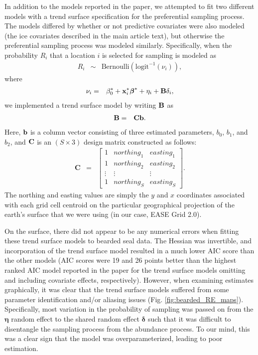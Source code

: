 \documentclass[times,mee,doublespace,]{besauth2}
\begin{document}
\begin{flushleft}

In addition to the models reported in the paper, we attempted to fit two different models with a trend surface specification for the preferential sampling process.  The models differed by whether or not predictive covariates were also modeled (the ice covariates described in the main article text), but otherwise the preferential sampling process was modeled similarly.  Specifically, when the probability $R_i$ that a location $i$ is selected for sampling is modeled as
\begin{eqnarray}
 \label{eq:R}
  R_i & \sim & \text{Bernoulli}(\textrm{logit}^{-1}(\nu_i)),
\end{eqnarray}
where
\begin{eqnarray}
  \label{eq:nu}
  \nu_i & = & \beta_0^* + {\bf x}_i^* \boldsymbol{\beta}^*+\eta_i+{\bf B} \delta_i,
\label{eq:nu}
\end{eqnarray}
we implemented a trend surface model by writing $\bf{B}$ as
\begin{eqnarray}
  \label{eq:B}
  \textbf{B} & = & {\bf C}{\bf b}.
\end{eqnarray}
Here, ${\bf b}$ is a column vector consisting of three estimated parameters, $b_0$, $b_1$, and $b_2$, and ${\bf C}$ is an $(S \times 3)$ design matrix constructed as follows:
\begin{eqnarray}
  \textbf{C} & = & \left[
    \begin{array}{ccc}
    1 & northing_1 & easting_1 \\
    1 & northing_2 & easting_2 \\
    \vdots & \vdots & \vdots \\
    1 & northing_S & easting_S
    \end{array}
  \right].
\end{eqnarray}
The northing and easting values are simply the $y$ and $x$ coordinates associated with each grid cell centroid on the particular geographical projection of the earth's surface that we were using (in our case, EASE Grid 2.0).

\hspace{0.5in} On the surface, there did not appear to be any numerical errors when fitting these trend surface models to bearded seal data.  The Hessian was invertible, and incorporation of the trend surface model resulted in a much lower AIC score than the other models (AIC scores were 19 and 26 points better than the highest ranked AIC model reported in the paper for the trend surface models omitting and including covariate effects, respectively).  However, when examining estimates graphically, it was clear that the trend surface models suffered from some parameter identification and/or aliasing issues (Fig. \ref{fig:bearded_RE_maps}).  Specifically, most variation in the probability of sampling was passed on from the $\boldsymbol{\eta}$ random effect to the shared random effect $\boldsymbol{\delta}$ such that it was difficult to disentangle the sampling process from the abundance process.  To our mind, this was a clear sign that the model was overparameterized, leading to poor estimation.


\end{flushleft}
\end{document}
